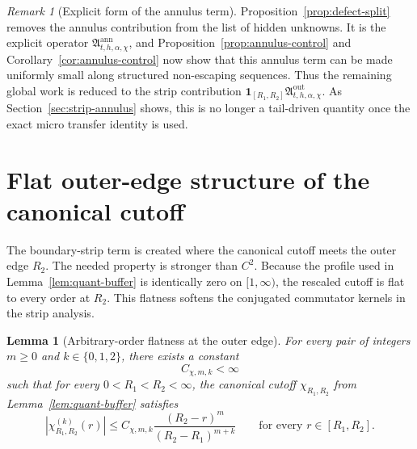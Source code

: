 \documentclass[11pt,a4paper]{amsart}
\theoremstyle{plain}
\newtheorem{lemma}[theorem]{Lemma}
\theoremstyle{definition}
\theoremstyle{remark}
\newtheorem{remark}[theorem]{Remark}
\newcommand{\one}{\mathbf 1}
\begin{document}
\begin{remark}[Explicit form of the annulus term]
\label{rem:annulus-explicit}
Proposition~\ref{prop:defect-split} removes the annulus contribution from the list of hidden
unknowns.  It is the explicit operator \(\mathfrak A_{t,h,\alpha,\chi}^{\mathrm{ann}}\), and
Proposition~\ref{prop:annulus-control} and Corollary~\ref{cor:annulus-control} now show that this
annulus term can be made uniformly small along structured non-escaping sequences. Thus the
remaining global work is reduced to the strip contribution
\(\one_{[R_1,R_2]}\mathfrak A_{t,h,\alpha,\chi}^{\mathrm{out}}\). As
Section~\ref{sec:strip-annulus} shows, this is no longer a tail-driven quantity once the
exact micro transfer identity is used.
\end{remark}

\section{Flat outer-edge structure of the canonical cutoff}
\label{sec:flat-cutoff}

The boundary-strip term is created where the canonical cutoff meets the outer edge \(R_2\).  The
needed property is stronger than \(C^2\).  Because the profile used in Lemma~\ref{lem:quant-buffer}
is identically zero on \([1,\infty)\), the rescaled cutoff is flat to every order at \(R_2\).  This
flatness softens the conjugated commutator kernels in the strip analysis.

\begin{lemma}[Arbitrary-order flatness at the outer edge]
\label{lem:quant-buffer-flat}
For every pair of integers \(m\ge0\) and \(k\in\{0,1,2\}\), there exists a constant
\[
C_{\chi,m,k}<\infty
\]
such that for every \(0<R_1<R_2<\infty\), the canonical cutoff \(\chi_{R_1,R_2}\) from
Lemma~\ref{lem:quant-buffer} satisfies
\begin{equation}\label{eq:quant-buffer-flat}
\left|
\chi_{R_1,R_2}^{(k)}(r)
\right|
\le
C_{\chi,m,k}
\frac{(R_2-r)^m}{(R_2-R_1)^{m+k}}
\qquad\text{for every }r\in[R_1,R_2].
\end{equation}
\end{lemma}
\end{document}
